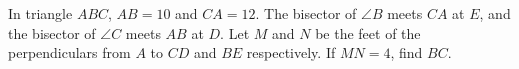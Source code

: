 In triangle $ABC$, $AB=10$ and $CA=12$. The bisector of $\angle B$ meets $CA$ at $E$, and the bisector of $\angle C$ meets $AB$ at $D$. Let $M$ and $N$ be the feet of the perpendiculars from $A$ to $CD$ and $BE$ respectively. If $MN=4$, find $BC$.
